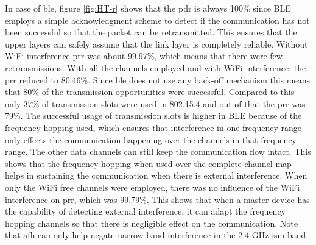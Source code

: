 In case of \gls{ble}, figure \ref{fig:HT-r} shows that the \gls{pdr} is always 100\% since BLE employs a simple acknowledgment scheme to detect if the communication has not been successful so that the packet can be retransmitted. This ensures that the upper layers can safely assume that the link layer is completely reliable. Without WiFi interference \gls{prr} was about 99.97\%, which means that there were few retransmissions. With all the channels employed and with WiFi interference, the \gls{prr} reduced to 80.46\%. Since \gls{ble} does not use any back-off mechanism this means that 80\% of the transmission opportunities were successful. Compared to this only 37\% of transmission slots were used in 802.15.4 and out of that the \gls{prr} was 79\%.  The successful usage of transmission slots is higher in BLE because of the frequency hopping used, which ensures that interference in one frequency range only effects the communication happening over the channels in that frequency range. The other data channels can still keep the communication flow intact. This shows that the frequency hopping when used over the complete channel map helps in sustaining the communication when there is external interference. When only the WiFi free channels were employed, there was no influence of the WiFi interference on \gls{prr}, which was 99.79\%. This shows that when a master device has the capability of detecting external interference, it can adapt the frequency hopping channels so that there is negligible effect on the communication. Note that \gls{afh} can only help negate narrow band interference in the 2.4 GHz \gls{ism} band.
%
%
